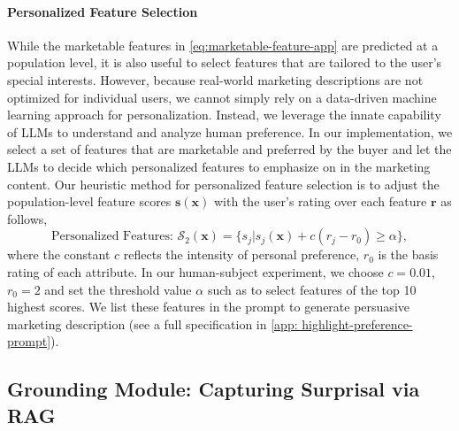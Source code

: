 \paragraph{Personalized Feature Selection}
While the marketable features in \cref{eq:marketable-feature-app} are predicted at a population level, it is also useful to select features that are tailored to the user's special interests. 
However, because real-world marketing descriptions are not optimized for individual users, we cannot simply rely on a data-driven machine learning approach for personalization.
Instead, we leverage the innate capability of LLMs to understand and analyze human preference. In our implementation, we select a set of features that are marketable and preferred by the buyer and let the LLMs to decide which personalized features to emphasize on in the marketing content. 
Our heuristic method for personalized feature selection is to adjust the population-level feature scores $\mathbf{s}(\mathbf{x})$ with the user's rating over each feature $\mathbf{r}$ as follows,
\begin{equation}
     \text{Personalized Features: }  \mathcal{S}_2(\mathbf{x}) = \{ s_j | s_j(\mathbf{x}) +   c (r_j - r_0) \geq \alpha  \},  
 \end{equation} 
where the constant $c$ reflects the intensity of personal preference, $r_0$ is the basis rating of each attribute. In our human-subject experiment, we choose $c=0.01$, $r_0=2$ and set the threshold value $\alpha$ such as to select features of the top 10 highest scores. We list these features in the prompt to generate persuasive marketing description (see a full specification in \cref{app: highlight-preference-prompt}).

\subsection{Grounding Module: Capturing Surprisal via RAG}
\label{sec: surprisal-app}

